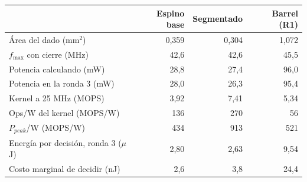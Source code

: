 \begin{tabular}{lrrr}
\toprule
 & Espino base & Segmentado & Barrel (R1) \\
\midrule
Área del dado (mm$^2$) & 0{,}359 & 0{,}304 & 1{,}072 \\
$f_{\max}$ con cierre (MHz) & 42{,}6 & 42{,}6 & 45{,}5 \\
Potencia calculando (mW) & 28{,}8 & 27{,}4 & 96{,}0 \\
Potencia en la ronda 3 (mW) & 28{,}0 & 26{,}3 & 95{,}4 \\
Kernel a 25 MHz (MOPS) & 3{,}92 & 7{,}41 & 5{,}34 \\
Ops/W del kernel (MOPS/W) & 136 & 270 & 56 \\
$P_{peak}$/W (MOPS/W) & 434 & 913 & 521 \\
Energía por decisión, ronda 3 ($\mu$J) & 2{,}80 & 2{,}63 & 9{,}54 \\
Costo marginal de decidir (nJ) & 2{,}6 & 3{,}8 & 24{,}4 \\
\bottomrule
\end{tabular}
\par{}
